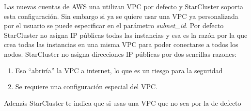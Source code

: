 \documentclass{article}
\begin{document}
	Las nuevas cuentas de AWS una utilizan VPC por defecto y  StarCluster soporta esta configuración. Sin embargo si ya se quiere usar una VPC ya personalizada por el usuario se puede especificar en el parámetro \emph{subnet\_id}. Por defecto StarCluster no asigna IP públicas todas las instancias y esa es la razón por la que crea todas las instancias en una misma VPC para poder conectarse a todos los nodos. StarCluster no asigna direcciones IP públicas por dos sencillas razones:
\begin{enumerate}
	\item Eso ``abriría'' la VPC a internet, lo que es un riesgo para la seguridad
	\item Se requiere una configuración especial del VPC.
\end{enumerate} 
	Además StarCluster te indica que si usas una VPC que no sea por la de defecto
\end{document}
